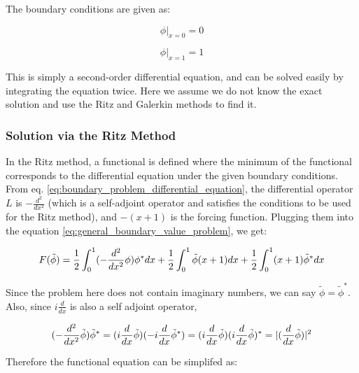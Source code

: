 \documentclass[a4paper,12pt]{report}
\begin{document}
The boundary conditions are given as:

\begin{equation}
  \left.\phi\right|_{x=0} = 0
\end{equation}

\begin{equation}
  \left.\phi\right|_{x=1}=1
\end{equation}

This is simply a second-order differential equation,
and can be solved easily by integrating the equation twice.
Here we assume we do not know the exact solution
and use the Ritz and Galerkin methods to find it.

\subsubsection{Solution via the Ritz Method}

In the Ritz method,
a functional is defined where the minimum of the functional
corresponds to the differential equation under the given boundary conditions.
From eq. \ref{eq:boundary_problem_differential_equation},
the differential operator $L$ is $-\frac{d^2}{dx^2}$ (which is
a self-adjoint operator and satisfies the conditions to be used for the Ritz method),
and $-(x+1)$ is the forcing function.
Plugging them into the equation \ref{eq:general_boundary_value_problem},
we get:

\begin{equation}
  F(\tilde{\phi}) = \frac{1}{2}\int_{0}^1 (-\frac{d^2}{dx^2}\phi) \phi^* dx \\
  + \frac{1}{2}\int_{0}^1 \tilde{\phi}(x + 1) dx \\
  + \frac{1}{2}\int_{0}^1 (x + 1)\tilde{\phi}^* dx
\end{equation}

Since the problem here does not contain imaginary numbers,
we can say $\tilde{\phi} = \tilde{\phi}^*$.
Also, since $i\frac{d}{dx}$ is also a self adjoint operator,

\begin{equation}
  (-\frac{d^2}{dx^2}\tilde{\phi}) \tilde{\phi}^* = \\
  (i\frac{d}{dx}\tilde{\phi})(-i\frac{d}{dx}\tilde{\phi}^*) \\
  = (i\frac{d}{dx}\tilde{\phi})(i\frac{d}{dx}\tilde{\phi})^* \\
  = |(\frac{d}{dx}\tilde{\phi})|^2
\end{equation}

Therefore the functional equation can be simplifed as:
\end{document}
